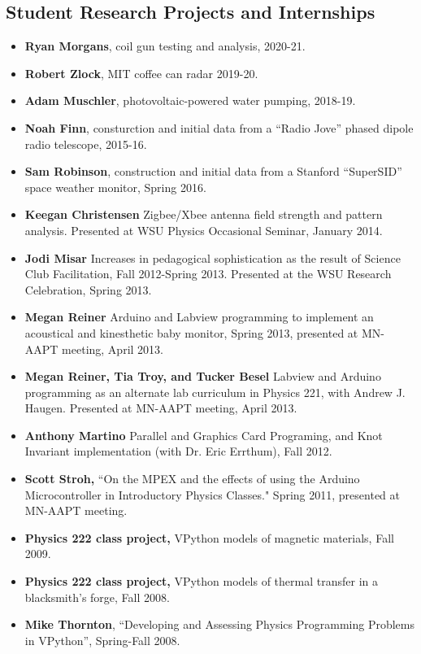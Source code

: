 \documentclass[margin,line,letterpaper]{res}
\begin{document}
\begin{resume}
\section{\bf Student Research Projects and Internships}
\begin{itemize}
\item \textbf{Ryan Morgans}, coil gun testing and analysis, 2020-21.
\item \textbf{Robert Zlock}, MIT coffee can radar 2019-20.
\item \textbf{Adam Muschler}, photovoltaic-powered water pumping, 2018-19.
\item \textbf{Noah Finn}, consturction and initial data from a ``Radio Jove'' phased dipole radio telescope, 2015-16.
\item \textbf{Sam Robinson}, construction and initial data from a Stanford ``SuperSID'' space weather monitor, Spring 2016.
\item \textbf{Keegan Christensen} Zigbee/Xbee antenna field strength and pattern analysis.  Presented at WSU Physics Occasional Seminar, January 2014.
\item \textbf{Jodi Misar} Increases in pedagogical sophistication as the result of Science Club Facilitation, Fall 2012-Spring 2013.  Presented at the WSU Research Celebration, Spring 2013.
\item \textbf{Megan Reiner} Arduino and Labview programming to implement an acoustical and kinesthetic baby monitor, Spring 2013, presented at MN-AAPT meeting, April 2013.
\item \textbf{Megan Reiner, Tia Troy, and Tucker Besel} Labview and Arduino programming as an alternate lab curriculum in Physics 221, with Andrew J. Haugen.  Presented at MN-AAPT meeting, April 2013.
\item \textbf{Anthony Martino}  Parallel and Graphics Card Programing, and Knot Invariant implementation (with Dr. Eric Errthum), Fall 2012.
\item \textbf{Scott Stroh,} ``On the MPEX and the effects of using the Arduino Microcontroller in Introductory Physics Classes."  Spring 2011, presented at MN-AAPT meeting. 
\item \textbf{Physics 222 class project,} VPython models of magnetic materials,
Fall 2009.
\item \textbf{Physics 222 class project,} VPython models of thermal transfer in a blacksmith's forge, 
Fall 2008.
\item \textbf{Mike Thornton}, ``Developing and Assessing Physics Programming Problems in VPython'', Spring-Fall 2008.

\end{itemize}
\end{resume}
\end{document}
